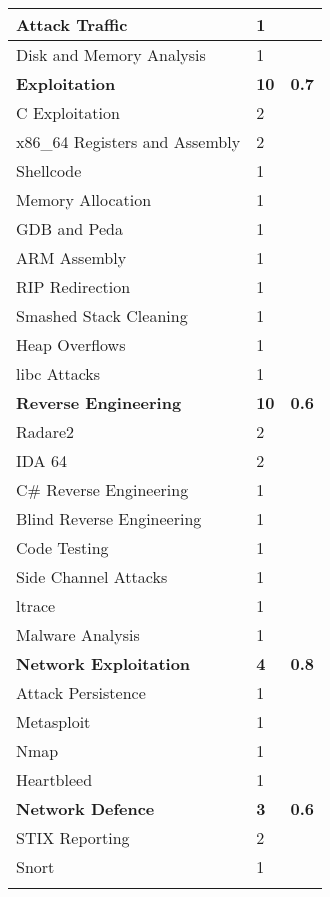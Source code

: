 \documentclass[twoside,a4paper,11pt]{report}
\begin{document}
\begin{center}
\begin{longtable}{| l | l | l |}
					\quad Attack Traffic & 1 & \\ \hline 
					\quad Disk and Memory Analysis & 1 & \\ \hline 
					\textbf{Exploitation} & \textbf{10} & \textbf{0.7} \\ \hline
					\quad C Exploitation & 2 & \\ \hline 
					\quad x86\_64 Registers and Assembly & 2 & \\ \hline
					\quad Shellcode & 1 & \\ \hline
					\quad Memory Allocation & 1 & \\ \hline
					\quad GDB and Peda & 1 & \\ \hline
					\quad ARM Assembly & 1 & \\ \hline
					\quad RIP Redirection & 1 & \\ \hline 
					\quad Smashed Stack Cleaning & 1 & \\ \hline 
					\quad Heap Overflows & 1 & \\ \hline 
					\quad libc Attacks & 1 & \\ \hline 
					\textbf{Reverse Engineering} & \textbf{10} & \textbf{0.6}\\ \hline 
					\quad Radare2 & 2 & \\ \hline 
					\quad IDA 64 & 2 & \\ \hline 
					\quad C\# Reverse Engineering & 1 & \\ \hline
					\quad Blind Reverse Engineering & 1 & \\ \hline 
					\quad Code Testing & 1 & \\ \hline 
					\quad Side Channel Attacks & 1 & \\ \hline 
					\quad ltrace & 1 & \\ \hline 
					\quad Malware Analysis & 1 & \\ \hline
					\textbf{Network Exploitation} & \textbf{4} & \textbf{0.8} \\ \hline 
					\quad Attack Persistence & 1 & \\ \hline 
					\quad Metasploit & 1 & \\ \hline 
					\quad Nmap & 1 & \\ \hline 
					\quad Heartbleed & 1 & \\ \hline
					\textbf{Network Defence} & \textbf{3} & \textbf{0.6} \\ \hline
					\quad STIX Reporting & 2 & \\ \hline
					\quad Snort & 1 & \\ \hline
					\newpage

\end{longtable}
\end{center}
\end{document}
